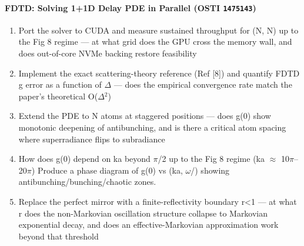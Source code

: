 \paragraph{FDTD: Solving 1+1D Delay PDE in Parallel \textnormal{\small(OSTI \texttt{1475143})}}
\begin{enumerate}[leftmargin=1.6em,itemsep=0.2em,topsep=0.2em,label=Q\arabic*.]
\item Port the solver to CUDA and measure sustained throughput for (N, N) up to the Fig 8 regime --- at what grid does the GPU cross the memory wall, and does out-of-core NVMe backing restore feasibility
\item Implement the exact scattering-theory reference (Ref [8]) and quantify FDTD g error as a function of $\Delta$ --- does the empirical convergence rate match the paper's theoretical O($\Delta$$^2$)
\item Extend the PDE to N atoms at staggered positions --- does g(0) show monotonic deepening of antibunching, and is there a critical atom spacing where superradiance flips to subradiance
\item How does g(0) depend on ka beyond $\pi$/2 up to the Fig 8 regime (ka $\approx$ 10$\pi$--20$\pi$) Produce a phase diagram of g(0) vs (ka, $\omega$/) showing antibunching/bunching/chaotic zones.
\item Replace the perfect mirror with a finite-reflectivity boundary r\textless{}1 --- at what r does the non-Markovian oscillation structure collapse to Markovian exponential decay, and does an effective-Markovian approximation work beyond that threshold
\end{enumerate}
